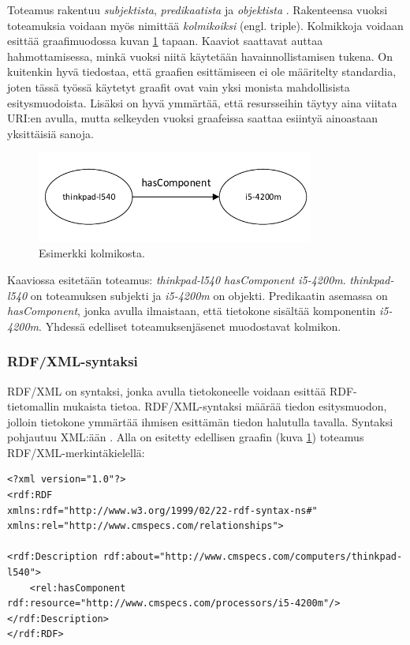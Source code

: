 \documentclass[finnish, 12pt, a4paper, elec, utf8, pdfa, online]{aaltothesis}
\begin{document}
Toteamus rakentuu \textit{subjektista}, \textit{predikaatista} ja \textit{objektista} \cite{lassila_dissertion}. Rakenteensa vuoksi toteamuksia voidaan myös nimittää \textit{kolmikoiksi} (engl. triple). Kolmikkoja voidaan esittää graafimuodossa kuvan \ref{images/RDF-triplet1} tapaan. Kaaviot saattavat auttaa hahmottamisessa, minkä vuoksi niitä käytetään havainnollistamisen tukena. On kuitenkin hyvä tiedostaa, että graafien esittämiseen ei ole määritelty standardia, joten tässä työssä käytetyt graafit ovat vain yksi monista mahdollisista esitysmuodoista. Lisäksi on hyvä ymmärtää, että resursseihin täytyy aina viitata URI:en avulla, mutta selkeyden vuoksi graafeissa saattaa esiintyä ainoastaan yksittäisiä sanoja.

\begin{figure}[htb]
\centering
\includegraphics[height=3cm]{images/RDF-triplet.pdf}
\caption{Esimerkki kolmikosta. \label{images/RDF-triplet1}}
\end{figure}

Kaaviossa esitetään toteamus: \textit{thinkpad-l540 hasComponent i5-4200m}. \textit{thinkpad-l540} on toteamuksen subjekti ja \textit{i5-4200m} on objekti. Predikaatin asemassa on \textit{hasComponent}, jonka avulla ilmaistaan, että tietokone sisältää komponentin \textit{i5-4200m}. Yhdessä edelliset toteamuksenjäsenet muodostavat kolmikon.



\subsubsection{RDF/XML-syntaksi}
RDF/XML on syntaksi, jonka avulla tietokoneelle voidaan esittää RDF-tietomallin mukaista tietoa. RDF/XML-syntaksi määrää tiedon esitysmuodon, jolloin tietokone ymmärtää ihmisen esittämän tiedon halutulla tavalla. Syntaksi pohjautuu XML:ään \cite{RDF_XML}. Alla on esitetty edellisen graafin (kuva \ref{images/RDF-triplet1}) toteamus RDF/XML-merkintäkielellä:

\vskip 0.75cm
\begin{lstlisting}[style=codeblock,caption={RDF/XML syntaksiesimerkki.},captionpos=b,label={rdf_esim}]
<?xml version="1.0"?>
<rdf:RDF
xmlns:rdf="http://www.w3.org/1999/02/22-rdf-syntax-ns#"
xmlns:rel="http://www.cmspecs.com/relationships">

<rdf:Description rdf:about="http://www.cmspecs.com/computers/thinkpad-l540">
    <rel:hasComponent rdf:resource="http://www.cmspecs.com/processors/i5-4200m"/>
</rdf:Description>
</rdf:RDF>
\end{lstlisting}
\vskip 0.75cm
\end{document}
